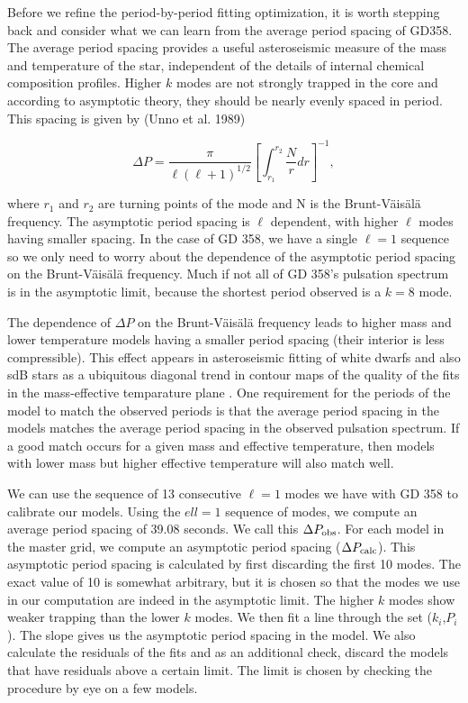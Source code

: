 \documentclass[12pt,preprint]{aastex}
\newcommand{\bvf}{Brunt-V\"ais\"al\"a }
\begin{document}
Before we refine the period-by-period fitting optimization, it is worth stepping back and consider 
what we can learn from the average period spacing of GD358. The average period spacing provides a 
useful asteroseismic measure of the mass and temperature of the star, independent of the details of 
internal chemical composition profiles. Higher $k$ modes are not strongly trapped in the core and 
according to asymptotic theory, they should be nearly evenly spaced in period. This spacing is 
given by (Unno et al. 1989)

\begin{equation}
\label{fiteq2}
\Delta P = \frac{\pi}{\ell(\ell + 1)^{1/2}}\left[\int_{r_1}^{r_2}\frac{N}{r}dr\right]^{-1},
\end{equation}

\noindent
where $r_1$ and $r_2$ are turning points of the mode and N is the Brunt-V\"{a}is\"{a}l\"{a} frequency. 
The asymptotic period spacing is $\ell$ dependent, with higher $\ell$ modes having smaller spacing. 
In the case of GD 358, we have a single $\ell=1$ sequence so we only need to worry about the dependence 
of the asymptotic period spacing on the \bvf frequency. Much if not all of GD 358's pulsation 
spectrum is in the asymptotic limit, because the shortest period observed is a $k=8$ mode.

The dependence of $\Delta P$ on the \bvf frequency leads to higher mass and lower temperature models 
having a smaller period spacing (their interior is less compressible). This effect appears in asteroseismic 
fitting of white dwarfs and also sdB stars as a ubiquitous diagonal trend in contour maps of the quality 
of the fits in the mass-effective temparature plane \citep[e.g][]{Bischoff-Kim14,Castanheira09,Charpinet08}. 
One requirement for the periods of the model to match the observed periods is that the average period spacing 
in the models matches the average period spacing in the observed pulsation spectrum. If a good match occurs 
for a given mass and effective temperature, then models with lower mass but higher effective temperature 
will also match well.

We can use the sequence of 13 consecutive $\ell=1$ modes we have with GD 358 to calibrate our models. 
Using the $ell=1$ sequence of modes, we compute an average period spacing of 39.08 seconds. We call 
this $\Delta P_{\rm obs}$. For each model in the master grid, we compute an asymptotic period spacing 
($\Delta P_{\rm calc}$). This asymptotic period spacing is calculated by first discarding the first 
10 modes. The exact value of 10 is somewhat arbitrary, but it is chosen so that the modes we use in 
our computation are indeed in the asymptotic limit. The higher $k$ modes show weaker trapping than the 
lower $k$ modes. We then fit a line through the set ($k_i$,$P_i$). The slope gives us the asymptotic 
period spacing in the model. We also calculate the residuals of the fits and as an additional check, 
discard the models that have residuals above a certain limit. The limit is chosen by checking the procedure 
by eye on a few models. 
\end{document}
